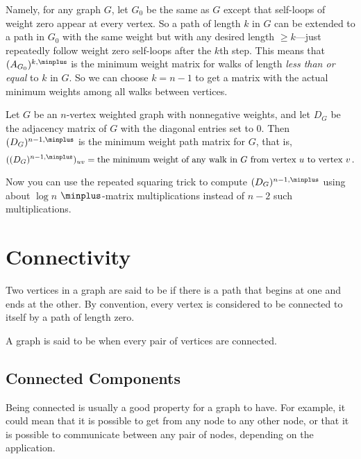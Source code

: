 Namely, for any graph $G$, let $G_0$ be the same as $G$ except that
self-loops of weight zero appear at every vertex.  So a path of length $k$
in $G$ can be extended to a path in $G_0$ with the same weight but with
any desired length $ \geq k$---just repeatedly follow weight zero
self-loops after the $k$th step.  This means that $(A_{G_0})^{k, \minplus}$
is the minimum weight matrix for walks of length \emph{less than or equal}
to $k$ in $G$.  So we can choose $k = n-1$ to get a matrix with the
actual minimum weights among all walks between vertices.

\begin{theorem}\label{thm:minweightmatrix}
Let $G$ be an $n$-vertex weighted graph with nonnegative weights, and let
$D_G$ be the adjacency matrix of $G$ with the diagonal entries set to 0.
Then $(D_G)^{n-1, \minplus}$ is the minimum weight path matrix for $G$, that
is,
\[
((D_G)^{n-1, \minplus})_{uv} = \text{the minimum weight of any walk in $G$ from
vertex $u$ to vertex $v$}\,.
\]
\end{theorem}
Now you can use the repeated squaring trick to compute $(D_G)^{n-1,
  \minplus}$ using about $\log n$ $\minplus$-matrix multiplications
instead of $n-2$ such multiplications.

\begin{editingnotes}
\end{editingnotes}

\section{Connectivity}

\begin{definition}
  Two vertices in a graph are said to be  if there
  is a path that begins at one and ends at the other.  By convention,
  every vertex is considered to be connected to itself by a path of
  length zero.
\end{definition}

\begin{definition}\label{def:connected-graph}
A graph is said to be  when every pair of vertices are
connected.
\end{definition}

\subsection{Connected Components}

Being connected is usually a good property for a graph to have.  For
example, it could mean that it is possible to get from any node to any
other node, or that it is possible to communicate between any pair of
nodes, depending on the application.

